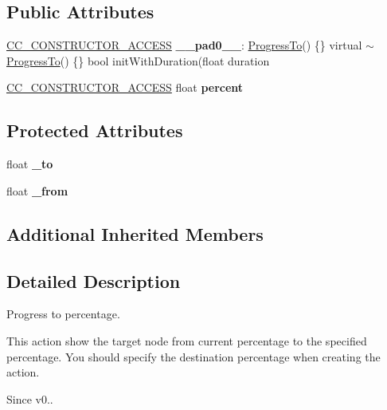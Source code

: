 \subsection*{Public Attributes}
\begin{DoxyCompactItemize}
\item 
\mbox{\label{classProgressTo_ade6e8a11a12ca800ab66911189cc9e1a}} 
\hyperlink{_2cocos2d_2cocos_2base_2ccConfig_8h_a25ef1314f97c35a2ed3d029b0ead6da0}{C\+C\+\_\+\+C\+O\+N\+S\+T\+R\+U\+C\+T\+O\+R\+\_\+\+A\+C\+C\+E\+SS} {\bfseries \+\_\+\+\_\+pad0\+\_\+\+\_\+}\+: \hyperlink{classProgressTo}{Progress\+To}() \{\} virtual $\sim$\hyperlink{classProgressTo}{Progress\+To}() \{\} bool init\+With\+Duration(float duration
\item 
\mbox{\label{classProgressTo_ac3266d109044e4616bf00c0b26ebd56c}} 
\hyperlink{_2cocos2d_2cocos_2base_2ccConfig_8h_a25ef1314f97c35a2ed3d029b0ead6da0}{C\+C\+\_\+\+C\+O\+N\+S\+T\+R\+U\+C\+T\+O\+R\+\_\+\+A\+C\+C\+E\+SS} float {\bfseries percent}
\end{DoxyCompactItemize}
\subsection*{Protected Attributes}
\begin{DoxyCompactItemize}
\item 
\mbox{\label{classProgressTo_a60b313c8f0980e009357be7496c8e0b8}} 
float {\bfseries \+\_\+to}
\item 
\mbox{\label{classProgressTo_a0d4cc5f9ec7c940f874adb5eeae39603}} 
float {\bfseries \+\_\+from}
\end{DoxyCompactItemize}
\subsection*{Additional Inherited Members}


\subsection{Detailed Description}
Progress to percentage. 

This action show the target node from current percentage to the specified percentage. You should specify the destination percentage when creating the action. \begin{DoxySince}{Since}
v0.. 
\end{DoxySince}



